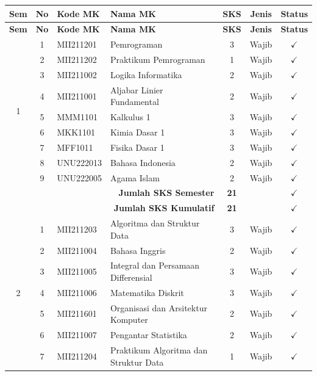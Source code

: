 \documentclass[a4paper,12pt]{article}
\begin{document}
\begin{longtable}{|c|c|l|p{5.5cm}|c|c|c|}
    \hline
    \textbf{Sem} & \textbf{No} & \textbf{Kode MK} & \textbf{Nama MK} & \textbf{SKS} & \textbf{Jenis} & \textbf{Status} \\
    \hline
    \endfirsthead
    \hline
    \textbf{Sem} & \textbf{No} & \textbf{Kode MK} & \textbf{Nama MK} & \textbf{SKS} & \textbf{Jenis} & \textbf{Status} \\
    \hline
    \endhead
    \multirow{9}{*}{1}
    & 1 & MII211201 & Pemrograman & 3 & Wajib & $\checkmark$ \\
    & 2 & MII211202 & Praktikum Pemrograman & 1 & Wajib & $\checkmark$ \\
    & 3 & MII211002 & Logika Informatika & 2 & Wajib & $\checkmark$ \\
    & 4 & MII211001 & Aljabar Linier Fundamental & 2 & Wajib & $\checkmark$ \\
    & 5 & MMM1101 & Kalkulus 1 & 3 & Wajib & $\checkmark$ \\
    & 6 & MKK1101 & Kimia Dasar 1 & 3 & Wajib & $\checkmark$ \\
    & 7 & MFF1011 & Fisika Dasar 1 & 3 & Wajib & $\checkmark$ \\
    & 8 & UNU222013 & Bahasa Indonesia & 2 & Wajib & $\checkmark$ \\
    & 9 & UNU222005 & Agama Islam & 2 & Wajib & $\checkmark$ \\
    \hline
    \multicolumn{4}{|r|}{\textbf{Jumlah SKS Semester}} & \textbf{21} & & $\checkmark$ \\
    \multicolumn{4}{|r|}{\textbf{Jumlah SKS Kumulatif}} & \textbf{21} & & $\checkmark$ \\
    \hline
    \multirow{10}{*}{2}
    & 1 & MII211203 & Algoritma dan Struktur Data & 3 & Wajib & $\checkmark$ \\
    & 2 & MII211004 & Bahasa Inggris & 2 & Wajib & $\checkmark$ \\
    & 3 & MII211005 & Integral dan Persamaan Differensial & 3 & Wajib & $\checkmark$ \\
    & 4 & MII211006 & Matematika Diskrit & 3 & Wajib & $\checkmark$ \\
    & 5 & MII211601 & Organisasi dan Arsitektur Komputer & 2 & Wajib & $\checkmark$ \\
    & 6 & MII211007 & Pengantar Statistika & 2 & Wajib & $\checkmark$ \\
    & 7 & MII211204 & Praktikum Algoritma dan Struktur Data & 1 & Wajib & $\checkmark$ \\

\end{longtable}
\end{document}
